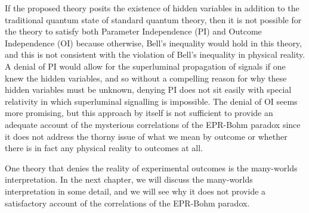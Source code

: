 \documentclass[12pt]{report}
\providecommand{\DIFaddbegin}{} %
\providecommand{\DIFaddend}{} %
\begin{document}
If the proposed theory posits the existence of hidden variables in addition to the traditional quantum state of standard quantum theory, then it is not possible for the theory to satisfy both Parameter Independence (PI) and Outcome Independence (OI) because otherwise, Bell's inequality would hold in this theory, and this is not consistent with the violation of Bell's inequality in physical reality. A denial of PI would allow for the superluminal propagation of signals if one knew the hidden variables, and so without a compelling reason for why these hidden variables must be  unknown, denying PI does not sit easily with special relativity in which superluminal signalling is impossible. The denial of OI seems more promising, but this approach by itself is not sufficient to provide an adequate account of the mysterious correlations of the EPR-Bohm paradox since it does not address the thorny issue of what we mean by outcome or whether there is in fact any physical reality to outcomes at all. 

One theory that denies the reality of experimental outcomes is the many-worlds interpretation. In the next chapter, we will discuss the many-worlds interpretation in some detail, and we will see why it does not provide a satisfactory account of the correlations of the EPR-Bohm paradox. 


\DIFaddbegin \newpage 
\DIFaddend %
\end{document}
